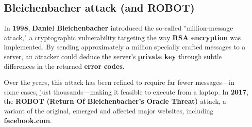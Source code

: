 \subsection{Bleichenbacher attack (and ROBOT)}
In \textbf{1998}, \textbf{Daniel Bleichenbacher} introduced the so-called "million-message attack," a cryptographic vulnerability targeting the way \textbf{RSA encryption} was implemented. By sending approximately a million specially crafted messages to a server, an attacker could deduce the server's \textbf{private key} through subtle differences in the returned \textbf{error codes}.

Over the years, this attack has been refined to require far fewer messages—in some cases, just thousands—making it feasible to execute from a laptop. In \textbf{2017}, the \textbf{ROBOT (Return Of Bleichenbacher’s Oracle Threat)} attack, a variant of the original, emerged and affected major websites, including \textbf{facebook.com}.

